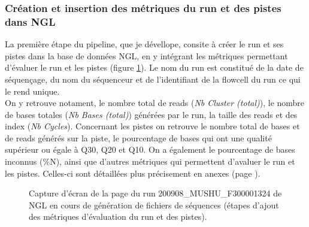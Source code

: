 \subsubsection*{Création et insertion des métriques du run et des pistes dans NGL }
La première étape du pipeline, que je dévellope, consite à créer le run et ses pistes dans la base de données NGL, en y intégrant les métriques permettant d'évaluer le run et les pistes (figure \ref{NGL-screenshot_run-lane}).
Le nom du run est constitué de la date de séquençage, du nom du séquenceur et de l'identifiant de la flowcell du run ce qui le rend unique.\\

On y retrouve notament, le nombre total de reads (\emph{Nb Cluster (total)}), le nombre de bases totales (\emph{Nb Bases (total)}) générées par le run, la taille des reads et des index (\emph{Nb Cycles}).
Concernant les pistes on retrouve le nombre total de bases et de reads générés sur la piste, le pourcentage de bases qui ont une qualité supérieur ou égale à Q30, Q20 et Q10. On a également le pourcentage de bases inconnus (\%N), ainsi que d'autres métriques qui permettent d'avaluer le run et les pistes. Celles-ci sont détaillées plus précisement en anexes (page \pageref{anexes1}).\\

\begin{figure}[H]
    \centering
    \caption{\footnotesize{Capture d'écran de la page du run 200908\_MUSHU\_F300001324 de NGL en cours de génération de fichiers de séquences (étapes d'ajout des métriques d'évaluation du run et des pistes).}}
    \label{NGL-screenshot_run-lane}
\end{figure}


